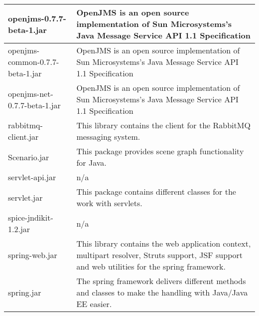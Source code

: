 \begin{center}
\begin{longtable}{|p{}|p{}|}
\hline 
openjms-0.7.7-beta-1.jar & OpenJMS is an open source implementation of Sun Microsystems's Java Message Service API 1.1 Specification\\
\hline 
openjms-common-0.7.7-beta-1.jar & OpenJMS is an open source implementation of Sun Microsystems's Java Message Service API 1.1 Specification\\
\hline 
openjms-net-0.7.7-beta-1.jar & OpenJMS is an open source implementation of Sun Microsystems's Java Message Service API 1.1 Specification\\
\hline 
rabbitmq-client.jar & This library contains the client for the RabbitMQ messaging system.\\
\hline 
Scenario.jar & This package provides scene graph functionality for Java.\\
\hline 
servlet-api.jar & n/a\\
\hline 
servlet.jar & This package contains different classes for the work with servlets.\\
\hline 
spice-jndikit-1.2.jar & n/a\\
\hline 
spring-web.jar & This library contains the web application context, multipart resolver, Struts support, JSF support and web utilities for the spring framework.\\
\hline 
spring.jar & The spring framework delivers different methods and classes to make the handling with Java/Java EE easier.\\
\hline 
\end{longtable}
\label{tabular:libraries}
\end{center}
